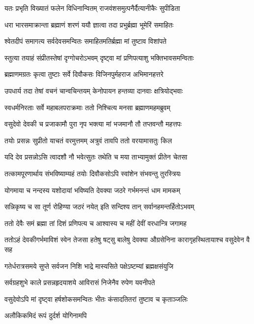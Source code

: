 \twolineshloka
{यतः प्रभृति विख्यातं फलेन विधिनान्वितम्}
{राजवंशसमुत्पनैर्दैत्यानीकैः सुपीडिता}%

\twolineshloka
{धरा भारसमाक्रान्ता ब्रह्माणं शरणं ययौ}
{ज्ञात्वा तदा प्रभुर्ब्रह्मा भूमेरिं समाहितः}%

\twolineshloka
{श्वेतदीपं समागत्य सर्वदेवसमन्वितः}
{समाहितमतिर्ब्रह्मा मां तुष्टाव विशांपते}%

\twolineshloka
{स्तुत्या तयाहं संप्रीतस्तेषां दृग्गोचरोऽभवम्}
{दृष्ट्वा मां प्रणिपत्याशु भक्तिभावसमन्विताः}%

\twolineshloka
{ब्रह्माणमग्रतः कृत्वा तुष्टाः सर्वे दिवौकसः}
{विजिनपुर्महराज अभिमानहत्तरे}%

\twolineshloka
{उपधार्य तदा तेषां वचनं चान्वचिन्तयम्}
{केनोपायन हन्तव्या दानवाः क्षत्रियोद्भवाः}%

\twolineshloka
{स्वधर्मनिरताः सर्वे महाबलपराक्रमाः}
{ततो निश्चित्य मनसा ब्रह्माणमहमब्रुवम्}%

\twolineshloka
{वसुदेवो देवकी च प्रजाकामौ पुरा नृप}
{भक्त्या मां भजमानौ तौ तप्तवन्तौ महत्तपः}%

\twolineshloka
{तयोः प्रसन्नः सुप्रीतो याचतं वरमुत्तमम्}
{अत्रुवं तावपि ततो वरयामासतुः किल}%

\twolineshloka
{यदि देव प्रसन्नोऽसि त्वादशौ नौ भवेत्सुतः}
{तथेति च मया ताभ्यामुक्तं प्रीतेन चेतसा}%

\twolineshloka
{तत्कामपूरणार्थाय संभविष्याम्यहं तयोः}
{दिवौकसोऽपि स्वांशेन संभवन्तु तुरस्त्रियः}%

\twolineshloka
{योगमाया च नन्दस्य यशोदायां भविष्यति}
{देवक्या जठरे गर्भमनन्तं धाम मामकम्}%

\twolineshloka
{सन्निकृष्य च सा तूर्ण रोहिण्या जठरं नयेत्}
{इति सन्दिश्य तान् सर्वानहमन्तर्हितोऽभवम्}%

\twolineshloka
{ततो देवैः समं ब्रह्मा तां दिशं प्रणिपत्य च}
{आश्वास्य च महीं देवीं वरधान्त्रि जगामह}%

\threelineshloka
{ततोऽहं देवकीगर्भमाविशं स्वेन तेजसा}
{हतेषु षट्सु बालेषु देवक्या औग्रसेनिना}
{कारागृहस्थितायाश्च वसुदेवेन वै सह}%

\twolineshloka
{गतेर्धरात्रसमये सुप्ते सर्वजन निशि}
{भाद्रे मास्यसिते पक्षेऽष्टम्यां ब्रह्मक्षसंयुजि}%

\twolineshloka
{सर्वग्रहशुभे काले प्रसन्नहृदयाशये}
{आविरासं निजेनैव रुपेण यवनीपते}%

\twolineshloka
{वसुदेवोऽपि मां दृष्ट्वा हर्षशोकसमन्वितः}
{भीतः कंसादतितरां तुष्टाव च कृताञ्जलिः}%

\onelineshloka
{अलौकिकमिदं रूपं दुर्दर्श योगिनामपि}%

